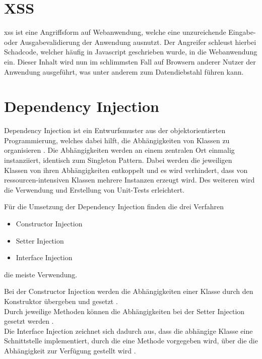 \section{XSS}
\gls{xss} ist eine Angriffsform auf Webanwendung, welche eine unzureichende Eingabe- oder Ausgabevalidierung der Anwendung ausnutzt.
Der Angreifer schleust hierbei Schadcode, welcher häufig in Javascript geschrieben wurde, in die Webanwendung ein.
Dieser Inhalt wird nun im schlimmsten Fall auf Browsern anderer Nutzer der Anwendung ausgeführt, was unter anderem zum Datendiebstahl führen kann.

\clearpage
 
\section{Dependency Injection} \label{dependencyinjection}
Dependency Injection ist ein Entwurfsmuster aus der objektorientierten Programmierung, welches dabei hilft, die Abhängigkeiten von Klassen zu organisieren \cite[S.~27]{dependency-book}. Die Abhängigkeiten werden an einem zentralen Ort einmalig instanziiert, identisch zum Singleton Pattern. Dabei werden die jeweiligen Klassen von ihren Abhängigkeiten entkoppelt und es wird verhindert, dass von ressourcen-intensiven Klassen mehrere Instanzen erzeugt wird. Des weiteren wird die Verwendung und Erstellung von Unit-Tests erleichtert.

Für die Umsetzung der Dependency Injection finden die drei Verfahren
\begin{itemize}
	\item Constructor Injection
	\item Setter Injection
	\item Interface Injection
\end{itemize}
die meiste Verwendung.

Bei der Constructor Injection werden die Abhängigkeiten einer Klasse durch den Konstruktor übergeben und gesetzt \cite[S.~119]{dependency-book}.\\
Durch jeweilige Methoden können die Abhängigkeiten bei der Setter Injection gesetzt werden \cite[S.~120]{dependency-book}.\\
Die Interface Injection zeichnet sich dadurch aus, dass die abhängige Klasse eine Schnittstelle implementiert, durch die eine Methode vorgegeben wird, über die die Abhängigkeit zur Verfügung gestellt wird \cite[S.~120]{dependency-book}.

\clearpage

